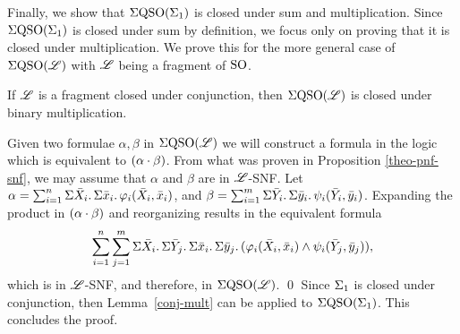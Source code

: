Finally, we show that $\Sigma{\rm QSO}(\Sigma_{1})$ is closed under sum and multiplication. 
Since $\Sigma{\rm QSO}(\Sigma_{1})$ is closed under sum by definition, we focus only on proving that it is closed under multiplication. 
We prove this for the more general case of $\Sigma{\rm QSO}(\mathscr{L})$ with $\mathscr{L}$ being a fragment of ${\rm SO}$.

\begin{lem} \label{conj-mult}
	If $\mathscr{L}$ is a fragment closed under conjunction, then $\Sigma{\rm QSO}(\mathscr{L})$ is closed under binary multiplication.
\end{lem}
\proof
	Given two formulae $\alpha, \beta$ in $\Sigma{\rm QSO}(\mathscr{L})$ we will construct a formula in the logic which is equivalent to $(\alpha\cdot \beta)$. 
	From what was proven in Proposition \ref{theo-pnf-snf}, we may assume that $\alpha$ and $\beta$ are in $\mathscr{L}$-SNF. 
	Let $\alpha = \sum_{i = 1}^n\Sigma{\bar{X}_i}.\,\Sigma{\bar{x}_i}.\,\varphi_i(\bar{X}_i,\bar{x}_i)$, and $\beta = \sum_{i = 1}^m\Sigma{\bar{Y}_i}.\,\Sigma{\bar{y}_i}.\,\psi_i(\bar{Y}_i,\bar{y}_i)$. Expanding the product in $(\alpha\cdot \beta)$ and reorganizing results in the equivalent formula
	$$
	\sum_{i = 1}^n\sum_{j = 1}^m\Sigma{\bar{X}_i}.\,\Sigma{\bar{Y}_j}.\,\Sigma{\bar{x}_i}.\,\Sigma{\bar{y}_j}.\,(\varphi_i(\bar{X}_i,\bar{x}_i)\wedge\psi_i(\bar{Y}_j,\bar{y}_j)),
	$$
	which is in $\mathscr{L}$-SNF, and therefore, in $\Sigma{\rm QSO}(\mathscr{L})$.
\qed
Since $\Sigma_{1}$ is closed under conjunction, then Lemma~\ref{conj-mult} can be applied to $\Sigma{\rm QSO}(\Sigma_{1})$. 
This concludes the proof.
